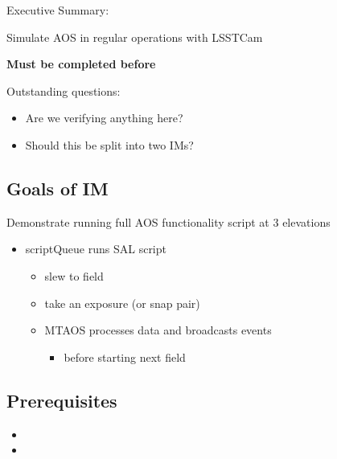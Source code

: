 
Executive Summary:

Simulate AOS in regular operations with LSSTCam

\textbf{Must be completed before }

Outstanding questions:
\begin{itemize}
\item Are we verifying anything here?
\item Should this be split into two \glspl{IM}?
\end{itemize}

\subsection{Goals of IM}
Demonstrate running full \gls{AOS} functionality script at 3 elevations
\begin{itemize}
\item scriptQueue runs \gls{SAL} script
  \begin{itemize}
  \item slew to field
  \item take an exposure (or snap pair)
  \item \gls{MTAOS} processes data and broadcasts events
    \begin{itemize}
    \item before starting next field
    \end{itemize}
  \end{itemize}
\end{itemize}

\subsection{Prerequisites}

\begin{itemize}
\item {}
\item {}
\end{itemize}
